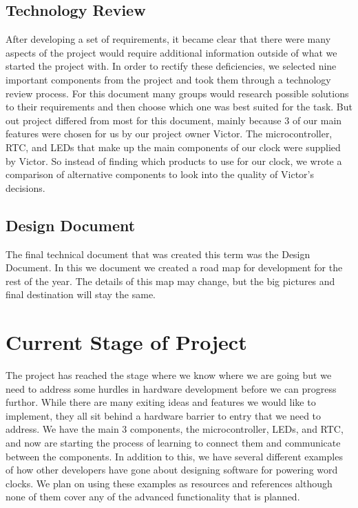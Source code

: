 \documentclass[10pt,draftclsnofoot,onecolumn]{IEEEtran}
\begin{document}
\subsection{Technology Review}
After developing a set of requirements, it became clear that there were many aspects of the project would require additional information outside of what we started the project with.
In order to rectify these deficiencies, we selected nine important components from the project and took them through a technology review process.
For this document many groups would research possible solutions to their requirements and then choose which one was best suited for the task. 
But out project differed from most for this document, mainly because 3 of our main features were chosen for us by our project owner Victor.
The microcontroller, RTC, and LEDs that make up the main components of our clock were supplied by Victor.
So instead of finding which products to use for our clock, we wrote a comparison of alternative components to look into the quality of Victor's decisions. 
\subsection{Design Document}
The final technical document that was created this term was the Design Document.
In this we document we created a road map for development for the rest of the year. 
The details of this map may change, but the big pictures and final destination will stay the same.

\section{Current Stage of Project}
The project has reached the stage where we know where we are going but we need to address some hurdles in hardware development before we can progress furthor.
While there are many exiting ideas and features we would like to implement, they all sit behind a hardware barrier to entry that we need to address.
We have the main 3 components, the microcontroller, LEDs, and RTC, and now are starting the process of learning to connect them and communicate between the components.
In addition to this, we have several different examples of how other developers have gone about designing software for powering word clocks.
We plan on using these examples as resources and references although none of them cover any of the advanced functionality that is planned.
\end{document}
